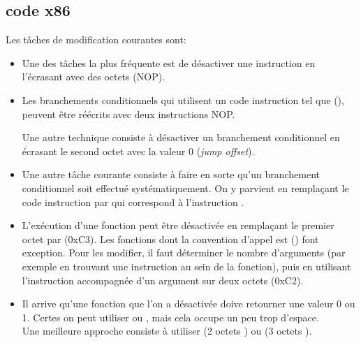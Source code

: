﻿
\label{patching}

\subsection{code x86}
\label{x86_patching}

Les tâches de modification courantes sont:

\begin{itemize}

\item Une des tâches la plus fréquente est de désactiver une instruction en l'écrasant
avec des octets  (\ac{NOP}).

\item Les branchements conditionnels qui utilisent un code instruction tel que  (\JZ),
peuvent être réécrits avec deux instructions \ac{NOP}.

Une autre technique consiste à désactiver un branchement conditionnel en écrasant le second octet
avec la valeur 0 (\emph{jump offset}).

\item
Une autre tâche courante consiste à faire en sorte qu'un branchement conditionnel soit effectué
systématiquement. On y parvient en remplaçant le code instruction par  qui correspond à
l'instruction \JMP.

\item L'exécution d'une fonction peut être désactivée en remplaçant le premier octet par \RETN (0xC3).
Les fonctions dont la convention d'appel est  () font exception.
Pour les modifier, il faut déterminer le nombre d'arguments (par exemple en trouvant une instruction
\RETN au sein de la fonction), puis en utilisant l'instruction \RETN accompagnée d'un argument sur
deux octets (0xC2).

\item Il arrive qu'une fonction que l'on a désactivée doive retourner une valeur 0 ou 1. Certes on
peut utiliser  ou , mais cela occupe un peu trop d'espace.\\
Une meilleure approche consiste à utiliser  (2 octets ) ou
 (3 octets ).

\end{itemize}

